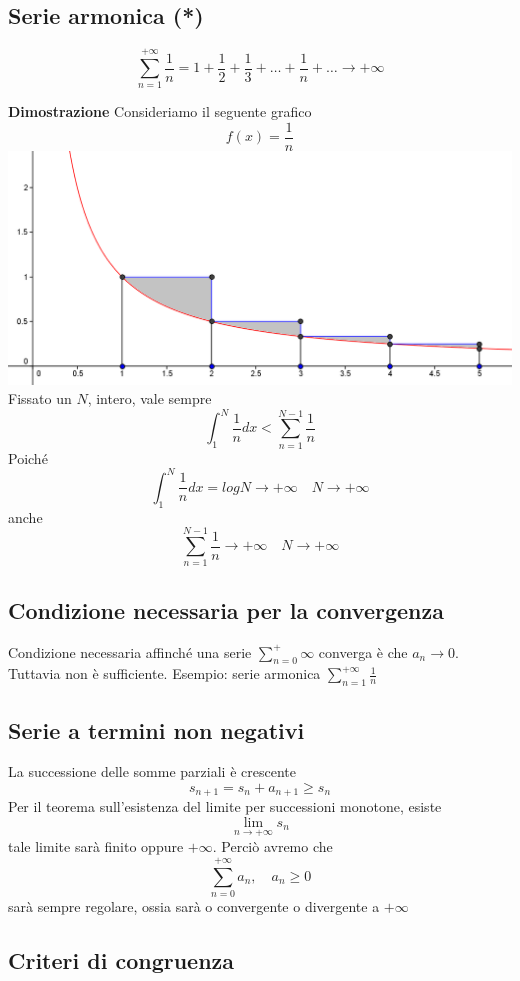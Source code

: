 \documentclass[12pt]{article}
\begin{document}
\subsection{Serie armonica (*)}
\[ \sum_{n=1}^{+\infty} \frac{1}{n} = 1 + \frac{1}{2} + \frac{1}{3} + \dots + \frac{1}{n} + \dots \to +\infty \]

\textbf{Dimostrazione}\newline
Consideriamo il seguente grafico
\[ f(x) = \frac{1}{n} \]
\includegraphics[width=\textwidth]{images/armonica.png}
Fissato un \(N\), intero, vale sempre 
\[ \int_1^N \frac{1}{n} dx  < \sum_{n=1}^{N-1} \frac{1}{n}\]
Poiché
\[ \int_1^N \frac{1}{n} dx = logN \to +\infty \quad N\to +\infty \]
anche
\[  \sum_{n=1}^{N-1} \frac{1}{n} \to +\infty \quad N \to +\infty \]

\subsection{Condizione necessaria per la convergenza}
Condizione necessaria affinché una serie \(\displaystyle \sum_{n=0}^+\infty\)
converga è che \( a_n \to 0\). Tuttavia non è sufficiente. Esempio: serie armonica \(\displaystyle \sum_{n=1}^{+\infty} \frac{1}{n}\)

\subsection{Serie a termini non negativi}
La successione delle somme parziali è crescente
\[
s_{n+1} = s_n + a_{n+1} \geq s_n
\]
Per il teorema sull'esistenza del limite per successioni monotone, esiste 
\[
\lim_{n \to +\infty} s_n
\]
tale limite sarà finito oppure $+\infty$. Perciò avremo che
\[
\sum_{n=0}^{+\infty} a_n, \quad a_n \geq 0
\]
sarà sempre regolare, ossia sarà o convergente o divergente a $+\infty$

\subsection{Criteri di congruenza}
\end{document}
